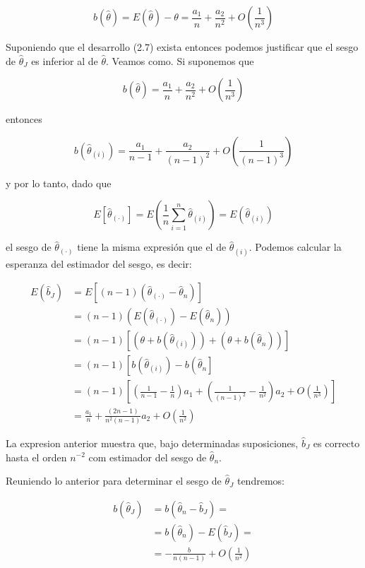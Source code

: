 \documentclass[
]{article}
\begin{document}
\[
b(\hat{\theta})=E(\hat{\theta})-\theta=\frac{a_{1}}{n}+\frac{a_{2}}{n^{2}}+O\left(\frac{1}{n^{3}}\right)
\]

Suponiendo que el desarrollo (2.7) exista entonces podemos justificar que el sesgo de \(\hat{\theta}_{J}\) es inferior al de \(\hat{\theta}\). Veamos como. Si suponemos que

\[
b(\hat{\theta})=\frac{a_{1}}{n}+\frac{a_{2}}{n^{2}}+O\left(\frac{1}{n^{3}}\right)
\]

entonces

\[
b\left(\hat{\theta}_{(i)}\right)=\frac{a_{1}}{n-1}+\frac{a_{2}}{(n-1)^{2}}+O\left(\frac{1}{(n-1)^{3}}\right)
\]

y por lo tanto, dado que

\[
E\left[\hat{\theta}_{(\cdot)}\right]=E\left(\frac{1}{n} \sum_{i=1}^{n} \hat{\theta}_{(i)}\right)=E\left(\hat{\theta}_{(i)}\right)
\]

el sesgo de \(\hat{\theta}_{(\cdot)}\) tiene la misma expresión que el de \(\hat{\theta}_{(i)}\). Podemos calcular la esperanza del estimador del sesgo, es decir:

\[
\begin{aligned}
E\left(\hat{b}_{J}\right) & =E\left[(n-1)\left(\hat{\theta}_{(\cdot)}-\hat{\theta}_{n}\right)\right] \\
& =(n-1)\left(E\left(\hat{\theta}_{(\cdot)}\right)-E\left(\hat{\theta}_{n}\right)\right) \\
& =(n-1)\left[\left(\theta+b\left(\hat{\theta}_{(i)}\right)\right)+\left(\theta+b\left(\hat{\theta}_{n}\right)\right)\right] \\
& =(n-1)\left[b\left(\hat{\theta}_{(i)}\right)-b\left(\hat{\theta}_{n}\right]\right. \\
& =(n-1)\left[\left(\frac{1}{n-1}-\frac{1}{n}\right) a_{1}+\left(\frac{1}{(n-1)^{2}}-\frac{1}{n^{2}}\right) a_{2}+O\left(\frac{1}{n^{3}}\right)\right] \\
& =\frac{a_{1}}{n}+\frac{(2 n-1)}{n^{2}(n-1)} a_{2}+O\left(\frac{1}{n^{2}}\right)
\end{aligned}
\]

La expresion anterior muestra que, bajo determinadas suposiciones, \(\hat{b}_{J}\) es correcto hasta el orden \(n^{-2}\) com estimador del sesgo de \(\hat{\theta}_{n}\).

Reuniendo lo anterior para determinar el sesgo de \(\hat{\theta}_{J}\) tendremos:

\[
\begin{aligned}
b\left(\hat{\theta}_{J}\right) & =b\left(\hat{\theta}_{n}-\hat{b}_{J}\right)= \\
& =b\left(\hat{\theta}_{n}\right)-E\left(\hat{b}_{J}\right)= \\
& =-\frac{b}{n(n-1)}+O\left(\frac{1}{n^{2}}\right)
\end{aligned}
\]
\end{document}
